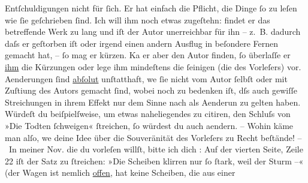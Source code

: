 \begin{ledgroupsized}[t]{13cm}
               Entſchuldigungen nicht für ſich. Er hat einfach die Pflicht, die Dinge ſo zu leſen
               wie ſie geſchrieben ſind. Ich will ihm noch etwas zugeſtehn: findet er das
               betreffende Werk zu lang und iſt der Autor unerreichbar für ihn – z. B. dadurch daſs
               er geſtorben iſt oder irgend einen andern Ausflug in {\pb}beſondere Fernen
               gemacht hat, – ſo mag er kürzen. Ka{\geminationn} er aber den Autor
               finden, ſo überlaſſe er \uline{ihm} die Kürzungen oder lege
               ihm mindeſtens die ſeinigen (die des Vorleſers) vor. Aenderungen ſind \uline{abſolut} unſtatthaft, we{\geminationn}{ }ſie nicht vom Autor ſelbſt oder mit Zuſti{\geminationm}ung des Autors gemacht ſind, wobei noch zu bedenken
               iſt, dſs auch gewiſſe Streichungen in ihrem Effekt nur dem {\pb}Sinne nach als
                  Aenderun zu gelten haben. Würdeſt du beiſpielſweise, um etwas naheliegendes zu
               citiren, den Schluſs von »Die Todten ſchweigen«
               ſtreichen, ſo würdest du auch aendern. – Wohin käme man \introOben{}alſo\introOben{}, we{\geminationn} deine Idee über die Souveränität des
               Vorleſers zu Recht beſtände!\pend
           \pstart
           – In meiner Nov. die du vorleſen willſt, bitte ich dich \label{K_L00740-1v}\label{K_L00740-1h}:
               Auf der vierten Seite, Zeile 22 iſt der Satz zu ſtreichen: »Die Scheiben klirren nur
               ſo ſtark, weil der Sturm –« (der Wagen ist nemlich \uline{offen}, hat keine {\pb}Scheiben, die aus einer
                  \label{K_L00740-2v}
\end{ledgroupsized}
